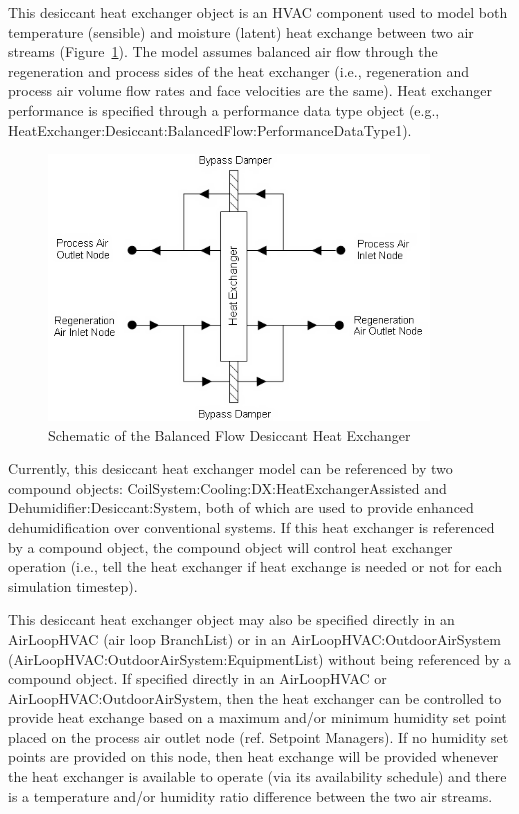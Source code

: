This desiccant heat exchanger object is an HVAC component used to model both temperature (sensible) and moisture (latent) heat exchange between two air streams (Figure~\ref{fig:schematic-of-the-balanced-flow-desiccant-heat}). The model assumes balanced air flow through the regeneration and process sides of the heat exchanger (i.e., regeneration and process air volume flow rates and face velocities are the same). Heat exchanger performance is specified through a performance data type object (e.g., HeatExchanger:Desiccant:BalancedFlow:PerformanceDataType1).

\begin{figure}[hbtp] %
\centering
\includegraphics[width=0.9\textwidth, height=0.9\textheight, keepaspectratio=true]{media/image424.png}
\caption{Schematic of the Balanced Flow Desiccant Heat Exchanger \protect \label{fig:schematic-of-the-balanced-flow-desiccant-heat}}
\end{figure}

Currently, this desiccant heat exchanger model can be referenced by two compound objects: CoilSystem:Cooling:DX:HeatExchangerAssisted and Dehumidifier:Desiccant:System, both of which are used to provide enhanced dehumidification over conventional systems. If this heat exchanger is referenced by a compound object, the compound object will control heat exchanger operation (i.e., tell the heat exchanger if heat exchange is needed or not for each simulation timestep).

This desiccant heat exchanger object may also be specified directly in an AirLoopHVAC (air loop BranchList) or in an AirLoopHVAC:OutdoorAirSystem (AirLoopHVAC:OutdoorAirSystem:EquipmentList) without being referenced by a compound object. If specified directly in an AirLoopHVAC or AirLoopHVAC:OutdoorAirSystem, then the heat exchanger can be controlled to provide heat exchange based on a maximum and/or minimum humidity set point placed on the process air outlet node (ref. Setpoint Managers). If no humidity set points are provided on this node, then heat exchange will be provided whenever the heat exchanger is available to operate (via its availability schedule) and there is a temperature and/or humidity ratio difference between the two air streams.

